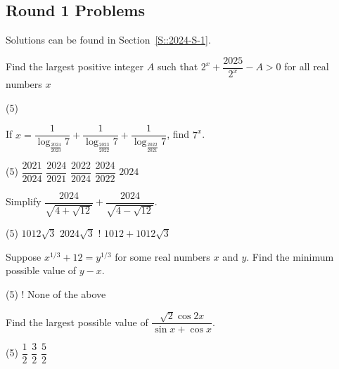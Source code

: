 \subsection{Round 1 Problems}

Solutions can be found in Section~\ref{S::2024-S-1}.

\mcq

\begin{enumerate}
    \hyperrefitem[A::2024-S-1-1] Find the largest positive integer $A$ such that $2^x + \dfrac{2025}{2^x} - A > 0$ for all real numbers $x$
    \begin{tasks}(5)
    \end{tasks}
    \hyperrefitem[A::2024-S-1-2] If $x = \dfrac{1}{\log_{\frac{2024}{2023}} 7} + \dfrac{1}{\log_{\frac{2023}{2022}} 7} + \dfrac{1}{\log_{\frac{2022}{2021}} 7}$, find $7^x$.
    \begin{tasks}(5)
        \task $\dfrac{2021}{2024}$
        \task $\dfrac{2024}{2021}$
        \task $\dfrac{2022}{2024}$
        \task $\dfrac{2024}{2022}$
        \task $2024$
    \end{tasks}
    \hyperrefitem[A::2024-S-1-3] Simplify $\dfrac{2024}{\sqrt{4 + \sqrt{12}}} + \dfrac{2024}{\sqrt{4 - \sqrt{12}}}$.
    \begin{tasks}(5)
        \task $1012\sqrt3$
        \task $2024\sqrt3$
        \task! $1012 + 1012\sqrt3$
    \end{tasks}
    \hyperrefitem[A::2024-S-1-4] Suppose $x^{1/3} + 12 = y^{1/3}$ for some real numbers $x$ and $y$. Find the minimum possible value of $y-x$.
    \begin{tasks}(5)
        \task! None of the above
    \end{tasks}
    \hyperrefitem[A::2024-S-1-5] Find the largest possible value of $\dfrac{\sqrt2 \cos{2x}}{\sin{x} + \cos{x}}$.
    \begin{tasks}(5)
        \task $\dfrac12$
        \task $\dfrac32$
        \task $\dfrac52$
    \end{tasks}
\end{enumerate}

\sq

